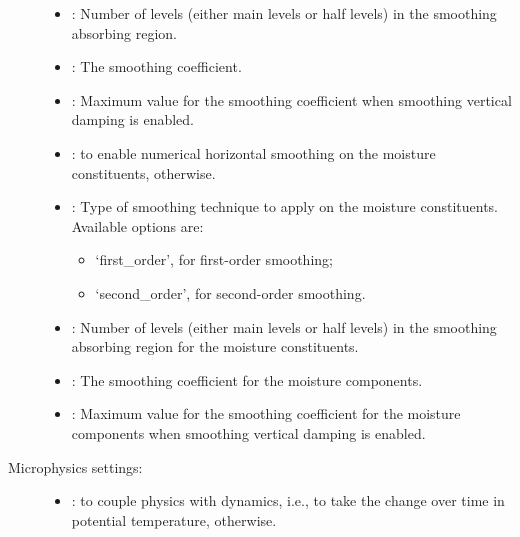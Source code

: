\documentclass[letterpaper,10pt,english]{sphinxmanual}
\begin{document}
\begin{description}
\begin{itemize}
\begin{itemize}
\end{itemize}

\item {} 
: Number of levels (either main levels or half levels) in the smoothing absorbing region.

\item {} 
: The smoothing coefficient.

\item {} 
: Maximum value for the smoothing coefficient when smoothing vertical damping is enabled.

\item {} 
:  to enable numerical horizontal smoothing on the moisture constituents,                  otherwise.

\item {} 
: Type of smoothing technique to apply on the moisture constituents. Available options are:
\begin{itemize}
\item {} 
‘first\_order’, for first-order smoothing;

\item {} 
‘second\_order’, for second-order smoothing.

\end{itemize}

\item {} 
: Number of levels (either main levels or half levels) in the smoothing absorbing region           for the moisture constituents.

\item {} 
: The smoothing coefficient for the moisture components.

\item {} 
: Maximum value for the smoothing coefficient for the moisture components when                 smoothing vertical damping is enabled.

\end{itemize}

\item[{Microphysics settings:}] \leavevmode\begin{itemize}
\item {} 
:  to couple physics with dynamics, i.e., to take the change over             time in potential temperature,  otherwise.


\end{itemize}
\end{description}
\end{document}
